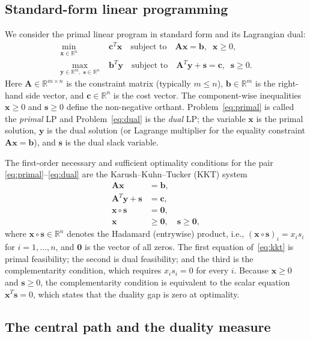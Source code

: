 \documentclass[11pt,twoside]{article}
\newcommand{\R}{\mathbb{R}}
\newcommand{\bA}{\mathbf{A}}
\newcommand{\bb}{\mathbf{b}}
\newcommand{\bc}{\mathbf{c}}
\newcommand{\bx}{\mathbf{x}}
\newcommand{\by}{\mathbf{y}}
\newcommand{\bs}{\mathbf{s}}
\begin{document}
\subsection{Standard-form linear programming}

We consider the primal linear program in standard form and its Lagrangian dual:
\begin{align}
  \min_{\bx \in \R^n}\;& \bc^T \bx
    \quad \text{subject to}\quad
    \bA\bx = \bb,\;\; \bx \ge 0,
    \label{eq:primal} \\[4pt]
  \max_{\by \in \R^m,\; \bs \in \R^n}\;& \bb^T \by
    \quad \text{subject to}\quad
    \bA^T\by + \bs = \bc,\;\; \bs \ge 0.
    \label{eq:dual}
\end{align}
Here $\bA \in \R^{m \times n}$ is the constraint matrix (typically
$m \le n$), $\bb \in \R^m$ is the right-hand side vector, and
$\bc \in \R^n$ is the cost vector.  The component-wise inequalities
$\bx \ge 0$ and $\bs \ge 0$ define the non-negative orthant.
Problem~\eqref{eq:primal} is called the \emph{primal} LP and
Problem~\eqref{eq:dual} is the \emph{dual} LP; the variable $\bx$ is the
primal solution, $\by$ is the dual solution (or Lagrange multiplier for
the equality constraint $\bA\bx = \bb$), and $\bs$ is the dual slack
variable.

The first-order necessary and sufficient optimality conditions for the pair
\eqref{eq:primal}--\eqref{eq:dual} are the Karush--Kuhn--Tucker (KKT)
system
\begin{equation}
  \begin{aligned}
    \bA\bx &= \bb, \\
    \bA^T\by + \bs &= \bc, \\
    \bx \circ \bs &= \mathbf{0}, \\
    \bx &\ge \mathbf{0},\quad \bs \ge \mathbf{0},
  \end{aligned}
  \label{eq:kkt}
\end{equation}
where $\bx \circ \bs \in \R^n$ denotes the Hadamard (entrywise) product,
i.e., $(\bx \circ \bs)_i = x_i s_i$ for $i = 1,\dots,n$, and
$\mathbf{0}$ is the vector of all zeros.  The first equation of~\eqref{eq:kkt}
is primal feasibility; the second is dual feasibility; and the third is the
complementarity condition, which requires $x_i s_i = 0$ for every $i$.  Because $\bx \ge 0$ and $\bs \ge 0$, the
complementarity condition is equivalent to the scalar equation
$\bx^T\bs = 0$, which states that the duality gap is zero at optimality.

\subsection{The central path and the duality measure}
\end{document}
